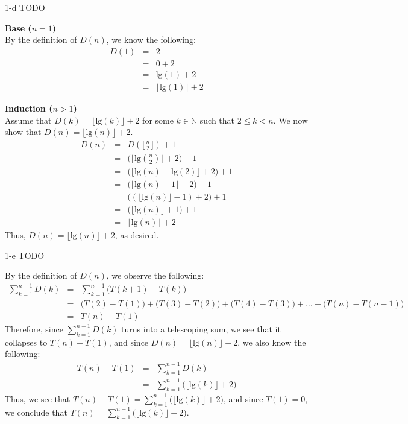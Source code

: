 \documentclass[11pt]{article}
\newcommand{\tlg}{\text{lg}}
\begin{document}
\begin{prob}{1-d}
TODO
\end{prob}
\begin{sol}
\textbf{Base ($n = 1$)} \\
By the definition of $D(n)$, we know the following:
\begin{eqnarray*}
D(1) & = & 2 \\ 
& = & 0 + 2 \\
& = & \tlg(1) + 2 \\
& = & \Big\lfloor\tlg(1)\Big\rfloor + 2 
\end{eqnarray*}

\textbf{Induction ($n > 1$)} \\
Assume that $D(k) = \Big\lfloor\tlg(k)\Big\rfloor + 2$ for some $k \in \mathbb{N}$ such that $2 \leq k < n$. We now show that $D(n) = \Big\lfloor\tlg(n)\Big\rfloor + 2$.
\begin{eqnarray*}
D(n) & = &  D(\Big\lfloor\frac{n}{2}\Big\rfloor) + 1 \\
& = & \Big(\Big\lfloor\tlg(\frac{n}{2})\Big\rfloor + 2\Big) + 1 \\
& = & \Big(\Big\lfloor\tlg(n) - \tlg(2)\Big\rfloor + 2\Big) + 1 \\
& = & \Big(\Big\lfloor\tlg(n) - 1\Big\rfloor + 2\Big) + 1 \\
& = & \Big((\Big\lfloor\tlg(n)\Big\rfloor - 1) + 2\Big) + 1 \\
& = & \Big(\Big\lfloor\tlg(n)\Big\rfloor + 1\Big) + 1 \\
& = & \Big\lfloor\tlg(n)\Big\rfloor + 2
\end{eqnarray*}
Thus, $D(n) = \Big\lfloor\tlg(n)\Big\rfloor + 2$, as desired.
\end{sol}

\begin{prob}{1-e}
TODO
\end{prob}
\begin{sol}
By the definition of $D(n)$, we observe the following:
\begin{eqnarray*}
\sum_{k=1}^{n-1}D(k) & = & \sum_{k=1}^{n-1}\Big(T(k + 1) - T(k)\Big) \\
& = & \big(T(2) - T(1)\big) + \big(T(3) - T(2)\big) + \big(T(4) - T(3)\big) + ... + \big(T(n) - T(n-1)\big) \\
& = & T(n) - T(1) 
\end{eqnarray*}
Therefore, since $\sum_{k=1}^{n-1}D(k)$ turns into a telescoping sum, we see that it collapses to $T(n) - T(1)$, and since $D(n) = \Big\lfloor\tlg(n)\Big\rfloor + 2$, we also know the following:
\begin{eqnarray*}
T(n) - T(1) & = & \sum_{k=1}^{n-1}D(k) \\
& = & \sum_{k=1}^{n-1}\big(\Big\lfloor\tlg(k)\Big\rfloor + 2\big)
\end{eqnarray*}
Thus, we see that $T(n) - T(1) = \sum_{k=1}^{n-1}\big(\Big\lfloor\tlg(k)\Big\rfloor + 2\big)$, and since $T(1) = 0$, we conclude that $T(n) = \sum_{k=1}^{n-1}\big(\Big\lfloor\tlg(k)\Big\rfloor + 2\big)$.
\end{sol}
\end{document}
